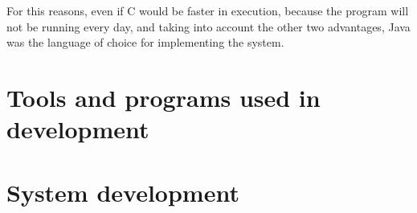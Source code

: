 For this reasons, even if C would be faster in execution, because the program will not be running every day, and taking into account the other two advantages, Java was the language of choice for implementing the system.


\section{Tools and programs used in development}

\section{System development}

